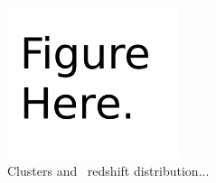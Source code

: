 \begin{figure}
 \begin{minipage}{0.5\textwidth}
    \centering
    \includegraphics[width=5cm]{figs/figure_sample.pdf}
  \end{minipage}

\caption{Clusters and \mgii\ redshift distribution...}
\label{fig:fig1}

\end{figure}
